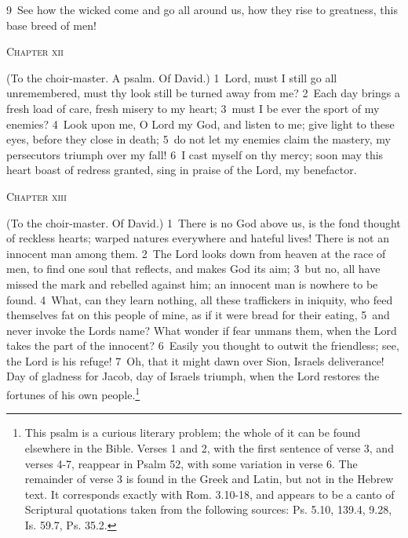\documentclass[10pt]{book} %
\begin{document}
\textcolor{benred8}{9}~See how the wicked come and go all around us, how they rise to greatness, this base breed of men!
\begin{large}\begin{center}\textsc{Chapter xii}\end{center}\end{large}
(To the choir-master. A psalm. Of David.)
\textcolor{benred8}{1}~Lord, must I still go all unremembered, must thy look still be turned away from me? \textcolor{benred8}{2}~Each day brings a fresh load of care, fresh misery to my heart; \textcolor{benred8}{3}~must I be ever the sport of my enemies? \textcolor{benred8}{4}~Look upon me, O Lord my God, and listen to me; give light to these eyes, before they close in death; \textcolor{benred8}{5}~do not let my enemies claim the mastery, my persecutors triumph over my fall! \textcolor{benred8}{6}~I cast myself on thy mercy; soon may this heart boast of redress granted, sing in praise of the Lord, my benefactor.
\begin{large}\begin{center}\textsc{Chapter xiii}\end{center}\end{large}
(To the choir-master. Of David.)
\textcolor{benred8}{1}~There is no God above us, is the fond thought of reckless hearts; warped natures everywhere and hateful lives! There is not an innocent man among them. \textcolor{benred8}{2}~The Lord looks down from heaven at the race of men, to find one soul that reflects, and makes God its aim; \textcolor{benred8}{3}~but no, all have missed the mark and rebelled against him; an innocent man is nowhere to be found. \textcolor{benred8}{4}~What, can they learn nothing, all these traffickers in iniquity, who feed themselves fat on this people of mine, as if it were bread for their eating, \textcolor{benred8}{5}~and never invoke the Lord\textquotesingle s name? What wonder if fear unmans them, when the Lord takes the part of the innocent? \textcolor{benred8}{6}~Easily you thought to outwit the friendless; see, the Lord is his refuge! \textcolor{benred8}{7}~Oh, that it might dawn over Sion, Israel\textquotesingle s deliverance! Day of gladness for Jacob, day of Israel\textquotesingle s triumph, when the Lord restores the fortunes of his own people.\footnote[1]{This psalm is a curious literary problem; the whole of it can be found elsewhere in the Bible. Verses 1 and 2, with the first sentence of verse 3, and verses 4-7, reappear in Psalm 52, with some variation in verse 6. The remainder of verse 3 is found in the Greek and Latin, but not in the Hebrew text. It corresponds exactly with Rom. 3.10-18, and appears to be a canto of Scriptural quotations taken from the following sources: Ps. 5.10, 139.4, 9.28, Is. 59.7, Ps. 35.2.}
\end{document}
